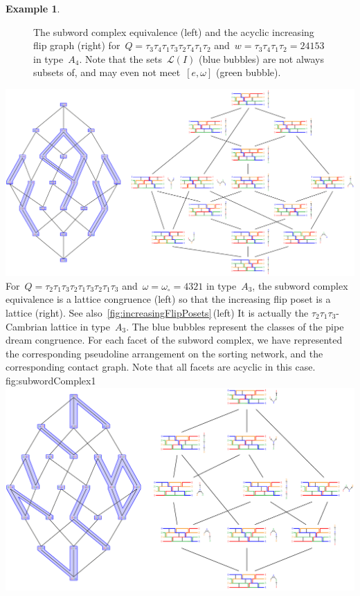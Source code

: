 \documentclass[reqno]{amsart}
\theoremstyle{definition}
\newtheorem{example}[theorem]{Example}
\newcommand{\linearExtensions}{\mathcal{L}} %
\newcommand{\wo}{\omega_\circ} %
\begin{document}
\begin{example}
\begin{figure}[p]
	\caption{The subword complex equivalence (left) and the acyclic increasing flip graph (right) for~$Q = \tau_3 \tau_4 \tau_1 \tau_3 \tau_2 \tau_4 \tau_1 \tau_2$ and~$w = \tau_3 \tau_4 \tau_1 \tau_2 = 24153$ in type~$A_4$. Note that the sets~$\linearExtensions(I)$ (blue bubbles) are not always subsets of, and may even not meet~$[e,\omega]$ (green bubble).}
	\label{fig:subwordComplex5}
\end{figure}
%
{\includegraphics[scale=.55]{subwordComplex1}}
{For~$Q = \tau_2 \tau_1 \tau_3 \tau_2 \tau_1 \tau_3 \tau_2 \tau_1 \tau_3$ and~$\omega = \wo = 4321$ in type~$A_3$, the subword complex equivalence is a lattice congruence (left) so that the increasing flip poset is a lattice (right). See also~\cref{fig:increasingFlipPosets}\,(left) It is actually the $\tau_2\tau_1\tau_3$-Cambrian lattice in type~$A_3$. The blue bubbles represent the classes of the pipe dream congruence. For each facet of the subword complex, we have represented the corresponding pseudoline arrangement on the sorting network, and the corresponding contact graph. Note that all facets are acyclic in this case.}
{fig:subwordComplex1}
%
{\includegraphics[scale=.65]{subwordComplex2}}

\end{example}
\end{document}
